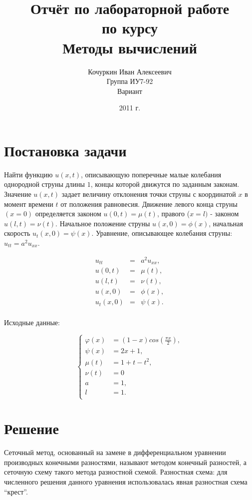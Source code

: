 \documentclass[titlepage,12pt]{article}
\author{Кочуркин Иван Алексеевич\\ Группа ИУ7-92 \\ Вариант \textnumero 11}
\title{Отчёт по лабораторной работе \textnumero 2 \\по курсу\\ Методы вычислений}
\date{2011 г.}
\begin{document}
\maketitle
\setcounter{page}{2}
\newpage

\section{Постановка задачи}
Найти функцию $u(x,t)$, описывающую поперечные малые колебания однородной струны длины $1$, концы которой движутся по заданным
законам. Значение $u(x,t)$ задает величину отклонения точки струны с координатой $x$ в момент времени $t$ от положения равновесия. Движение левого конца струны $(x = 0)$ определяется законом $u(0,t) = \mu(t)$, правого ($x = l)$ - законом $u(l,t) = \nu(t)$. Начальное положение струны $u(x,0) = \phi(x)$, начальная скорость $u_t(x,0) = \psi(x)$.
Уравнение, описывающее колебания струны: $u_{tt} = a^2 u_{xx}$.

\begin{eqnarray}
u_{tt} &=& a^2 u_{xx}, \\
u(0, t) &=& \mu(t), \\
u(l, t) &=& \nu(t), \\
u(x, 0) &=& \phi(x), \\
u_t(x, 0) &=& \psi(x). \\
\end{eqnarray}

Исходные данные:

\[
\left\{
\begin{array}{rl}
\varphi(x) &= (1-x)cos(\frac {\pi x} {2}), \\
\psi(x) &= 2x+1, \\
\mu(t) &= 1+t-t^2, \\
\nu(t) &= 0 \\
a &= 1, \\
l &= 1. \\
\end{array}
\right.
\]

\section{Решение}
Сеточный метод, основанный на замене в дифференциальном уравнении производных конечными разностями, называют методом конечный разностей, а сеточную схему такого метода разностной схемой. Разностная схема: для численного решения данного уравнения использовалась явная разностная схема “крест”.
\end{document}
